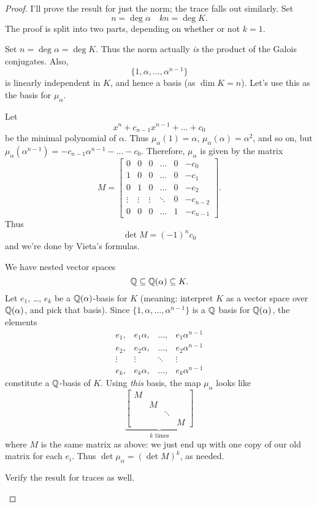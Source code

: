 \begin{proof}
I'll prove the result for just the norm; the trace falls out similarly.
Set
\[ n = \deg \alpha \quad kn = \deg K. \]
The proof is split into two parts, depending on whether or not $k=1$.
\begin{subproof}[Proof if $k=1$]
	Set $n = \deg \alpha = \deg K$.
	Thus the norm actually \emph{is} the product of the Galois conjugates.
	Also, \[ \{1, \alpha, \dots, \alpha^{n-1}\} \]
	is linearly independent in $K$, and hence a basis (as $\dim K = n$).
	Let's use this as the basis for $\mu_\alpha$.

	Let \[ x^n+c_{n-1}x^{n-1} + \dots + c_0  \]be the minimal polynomial of $\alpha$.
	Thus $\mu_\alpha(1) = \alpha$, $\mu_\alpha(\alpha) = \alpha^2$, and so on,
	but $\mu_\alpha(\alpha^{n-1}) = -c_{n-1}\alpha^{n-1} - \dots - c_0$.
	Therefore, $\mu_\alpha$ is given by the matrix
	\[
		M = 
		\begin{bmatrix}
			0 & 0 & 0 & \dots & 0 & -c_0 \\
			1 & 0 & 0 & \dots & 0 & -c_1 \\
			0 & 1 & 0 & \dots & 0 & -c_2 \\
			\vdots & \vdots & \vdots & \ddots & 0 & -c_{n-2} \\
			0 & 0 & 0 & \dots & 1 & -c_{n-1}
		\end{bmatrix}.
	\]
	Thus \[ \det M = (-1)^n c_0 \] and we're done by Vieta's formulas.
\end{subproof}
\begin{subproof}[Proof if $k > 1$]
	We have nested vector spaces
	\[ \mathbb Q \subseteq \mathbb Q(\alpha) \subseteq K. \]
	Let $e_1$, \dots, $e_k$ be a $\mathbb Q(\alpha)$-basis for $K$
	(meaning: interpret $K$ as a vector space over $\mathbb Q(\alpha)$, and pick that basis).
	Since $\{1, \alpha, \dots, \alpha^{n-1}\}$ is a $\mathbb Q$ basis for $\mathbb Q(\alpha)$,
	the elements
	\[
			\begin{array}{cccc}
			e_1, & e_1\alpha, & \dots, & e_1\alpha^{n-1} \\
			e_2, & e_2\alpha, & \dots, & e_2\alpha^{n-1} \\
			\vdots & \vdots & \ddots & \vdots \\
			e_k, & e_k\alpha, & \dots, & e_k\alpha^{n-1}
			\end{array}
	\]
	constitute a $\mathbb Q$-basis of $K$.
	Using \emph{this} basis, the map $\mu_\alpha$ looks like
	\[
			\underbrace{
			\begin{bmatrix}
					M & & & \\
					& M & & \\
					& & \ddots & \\
					& & & M
			\end{bmatrix}
			}_{\text{$k$ times}}
	\]
	where $M$ is the same matrix as above:
	we just end up with one copy of our old matrix for each $e_i$.
	Thus $\det \mu_\alpha = (\det M)^k$, as needed. \qedhere
\end{subproof}
\begin{ques}
	Verify the result for traces as well. \qedhere
\end{ques}
\end{proof}

